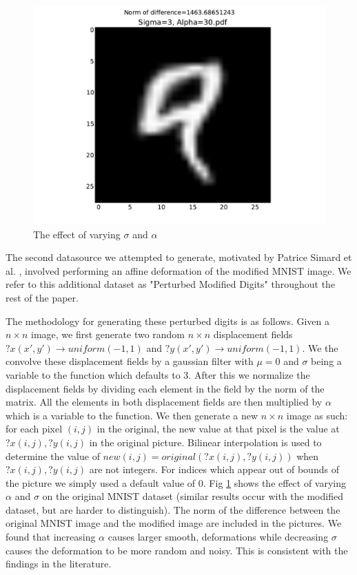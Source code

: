 \documentclass[conference]{IEEEtran}
\begin{document}
\begin{figure}[h]
	\includegraphics[scale=0.15]{Sigma=3,Alpha=30.pdf}
	\caption{The effect of varying $\sigma$ and $\alpha$}
	\label{Perturbed}
\end{figure}

The second datasource we attempted to generate, motivated by Patrice Simard et al. \cite{Simard}, involved performing an affine deformation of the modified MNIST image. 
We refer to this additional dataset as "Perturbed Modified Digits" throughout the rest of the paper. 

The methodology for generating these perturbed digits is as follows. 
Given a $n\times n$ image, we first generate two random $n\times n$ displacement fields $?x(x',y')\rightarrow uniform(-1,1)$ and $?y(x',y')\rightarrow uniform(-1,1)$. We the convolve these displacement fields by a gaussian filter with $\mu = 0$ and $\sigma$ being a variable to the function which defaults to 3. 
After this we normalize the displacement fields by dividing each element in the field by the norm of the matrix. 
All the elements in both displacement fields are then multiplied by $\alpha$ which is a variable to the function. 
We then generate a new $n\times n$ image as such: for each pixel $(i,j)$ in the original, the new value at that pixel is the value at $?x(i,j),?y(i,j)$ in the original picture. 
Bilinear interpolation is used to determine the value of $new(i,j)=original(?x(i,j),?y(i,j))$ when $?x(i,j),?y(i,j)$ are not integers. 
For indices which appear out of bounds of the picture we simply used a default value of 0. Fig \ref{Perturbed} shows the effect of varying $\alpha$ and $\sigma$ on the original MNIST dataset (similar results occur with the modified dataset, but are harder to distinguish). 
The norm of the difference between the original MNIST image and the modified image are included in the pictures. 
We found that increasing $\alpha$ causes larger smooth, deformations while decreasing $\sigma$ causes the deformation to be more random and noisy. This is consistent with the findings in the literature.
\end{document}

